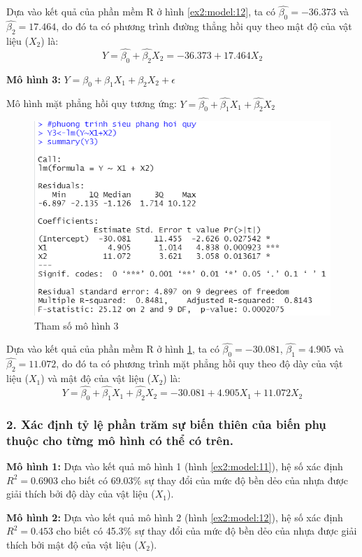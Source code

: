 \documentclass[a4paper]{article}
\theoremstyle{nonumberplain}
\begin{document}
Dựa vào kết quả của phần mềm R ở hình \ref{ex2:model:12}, ta có $\hat{\beta_0} = -36.373$ và $\hat{\beta_2} = 17.464$, do đó ta có phương trình đường thẳng hồi quy theo mật độ của vật liệu ($X_2$) là:
\[Y = \hat{\beta_0} + \hat{\beta_2} X_2 = -36.373 + 17.464 X_2\]

\textbf{Mô hình 3:} $Y= \beta_0 + \beta_1 X_1 + \beta_2 X_2+ \epsilon$

Mô hình mặt phẳng hồi quy tương ứng: $Y= \hat{\beta_0} + \hat{\beta_1} X_1 + \hat{\beta_2} X_2$

\begin{figure}[h!]
	\centering
	\includegraphics[width=0.7\linewidth]{bai2_1iii.PNG} 
	\caption{Tham số mô hình 3}
	\label{ex2:model:13}
\end{figure}

Dựa vào kết quả của phần mềm R ở hình \ref{ex2:model:13}, ta có $\hat{\beta_0} = -30.081$, $\hat{\beta_1} = 4.905$ và $\hat{\beta_2} = 11.072$, do đó ta có phương trình mặt phẳng hồi quy theo độ dày của vật liệu ($X_1$) và mật độ của vật liệu ($X_2$) là:
\[Y = \hat{\beta_0} + \hat{\beta_1} X_1 + \hat{\beta_2} X_2 = -30.081 + 4.905 X_1 + 11.072 X_2\]

\subsubsection*{2. Xác định tỷ lệ phần trăm sự biến thiên của biến phụ thuộc cho từng mô hình có thể có trên.}

\textbf{Mô hình 1:} Dựa vào kết quả mô hình 1 (hình \ref{ex2:model:11}), hệ số xác định $R^2= 0.6903$ cho biết có 69.03\% sự thay đổi của mức độ bền dẻo của nhựa được giải thích bởi độ dày của vật liệu ($X_1$).

\textbf{Mô hình 2:} Dựa vào kết quả mô hình 2 (hình \ref{ex2:model:12}), hệ số xác định $R^2= 0.453$ cho biết có 45.3\% sự thay đổi của mức độ bền dẻo của nhựa được giải thích bởi mật độ của vật liệu ($X_2$).
\end{document}
